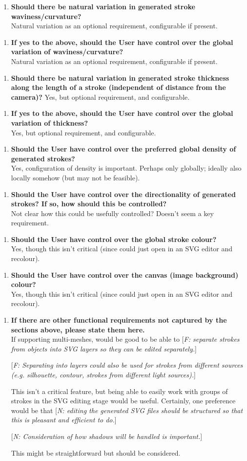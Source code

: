 \documentclass[a4paper,10pt]{article}
\newcommand{\freq}[1]{
    [\textit{F\arabic{fReqNum}: #1}]%
    \addtocounter{fReqNum}{10}%
}
\newcommand{\nreq}[1]{
    [\textit{N\arabic{nReqNum}: #1}]%
    \addtocounter{nReqNum}{10}%
}
\newcommand{\Qq}[1]{\textbf{#1}}
\newcommand{\Qitemf}[2][]{
\begin{enumerate}[topsep=2pt,leftmargin=2.8em]
\item[\textit{F\arabic{fReqNum}#1.}] #2
\addtocounter{fReqNum}{10}
\end{enumerate}
}
\begin{document}
\Qitemf{\Qq{Should there be natural variation in generated stroke waviness/curvature?} \\
Natural variation as an optional requirement, configurable if present.
}
\Qitemf{\Qq{If yes to the above, should the User have control over the global variation of waviness/curvature?} \\
Natural variation as an optional requirement, configurable if present.
}
\Qitemf{\Qq{Should there be natural variation in generated stroke thickness along the length of a stroke (independent of distance from the camera)?}
Yes, but optional requirement, and configurable.
}
\Qitemf{\Qq{If yes to the above, should the User have control over the global variation of thickness?} \\
Yes, but optional requirement, and configurable.
}
\Qitemf{\Qq{Should the User have control over the preferred global density of generated strokes?} \\
Yes, configuration of density is important. 
Perhaps only globally; ideally also locally somehow (but may not be feasible).
}
\Qitemf{\Qq{Should the User have control over the directionality of generated strokes? If so, how should this be controlled?} \\
Not clear how this could be usefully controlled? Doesn’t seem a key requirement.
}
\Qitemf{\Qq{Should the User have control over the global stroke colour?} \\
Yes, though this isn’t critical (since could just open in an SVG editor and recolour).
}
\Qitemf{\Qq{Should the User have control over the canvas (image background) colour?} \\
Yes, though this isn’t critical (since could just open in an SVG editor and recolour).
}
\Qitemf{\Qq{If there are other functional requirements not captured by the sections above, please state them here.} \\
If supporting multi-meshes, would be good to be able to \freq{separate strokes from objects into SVG layers so they can be edited separately.} 
\freq{Separating into layers could also be used for strokes from different sources (e.g. silhouette, contour, strokes from different light sources).}
This isn’t a critical feature, but being able to easily work with groups of strokes in the SVG editing stage would be useful.
Certainly, one preference would be that \nreq{editing the generated SVG files should be structured so that this is pleasant and efficient to do.}

\nreq{Consideration of how shadows will be handled is important.}
This might be straightforward but should be considered.
}
\end{document}
